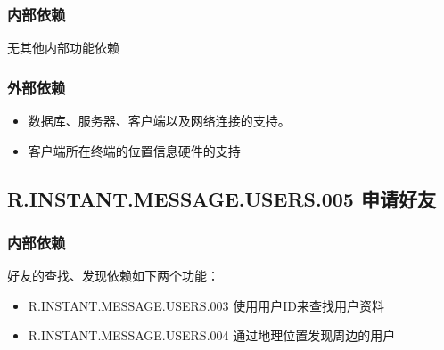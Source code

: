 \subsubsection{内部依赖}
    无其他内部功能依赖
\subsubsection{外部依赖}
\begin{itemize}
    \item 数据库、服务器、客户端以及网络连接的支持。
    \item 客户端所在终端的位置信息硬件的支持
\end{itemize}
\subsection{R.INSTANT.MESSAGE.USERS.005 申请好友}
\subsubsection{内部依赖}
    好友的查找、发现依赖如下两个功能：
    \begin{itemize}
        \item R.INSTANT.MESSAGE.USERS.003 使用用户ID来查找用户资料
        \item R.INSTANT.MESSAGE.USERS.004 通过地理位置发现周边的用户
    \end{itemize}
